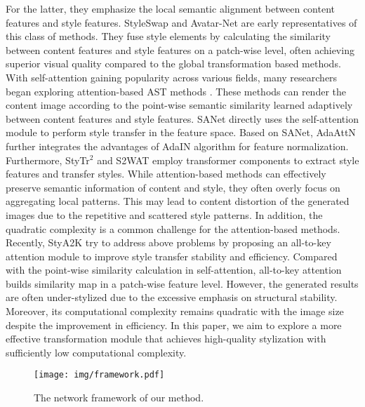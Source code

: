 For the latter, they emphasize the local semantic alignment between content features and style features. StyleSwap \cite{chenqianqi} and Avatar-Net \cite{Avatar-net} are early representatives of this class of methods. 
They fuse style elements by calculating the similarity between content features and style features on a patch-wise level, often achieving superior visual quality compared to the global transformation based methods. 
With self-attention \cite{transformer} gaining popularity across various fields,  many researchers began exploring attention-based AST methods \cite{adaattn,sanet,IEC}. 
These methods can render the content image according to the point-wise semantic similarity learned adaptively between content features and style features. 
SANet \cite{sanet} directly uses the self-attention module to perform style transfer in the feature space. Based on SANet, AdaAttN \cite{adaattn} further integrates the advantages of AdaIN algorithm for feature normalization. Furthermore, StyTr$^2$ \cite{stytr2} and S2WAT \cite{s2wat} employ transformer components \cite{vision_transformer} to extract style features and transfer styles. 
While attention-based methods can effectively preserve semantic information of content and style, they often overly focus on aggregating local patterns. This may lead to content distortion of the generated images due to the repetitive and scattered style patterns.
In addition, the quadratic complexity is a common challenge for the attention-based methods. 
Recently, StyA2K \cite{stya2k} try to address above problems by proposing an all-to-key attention module to improve style transfer stability and efficiency. Compared with the point-wise similarity calculation in self-attention, all-to-key attention builds similarity map in a patch-wise feature level. 
However, the generated results are often under-stylized due to the excessive emphasis on structural stability. 
Moreover, its computational complexity remains quadratic with the image size despite the improvement in efficiency. 
In this paper, we aim to explore a more effective transformation module that achieves high-quality stylization with sufficiently low computational complexity.

\begin{figure} [t!]
\centering
\setlength{\abovecaptionskip}{-0.3cm}
\texttt{[image: img/framework.pdf]}
\caption{The network framework of our method.}
\label{framework}
\vspace{-0.4cm}
\end{figure}

